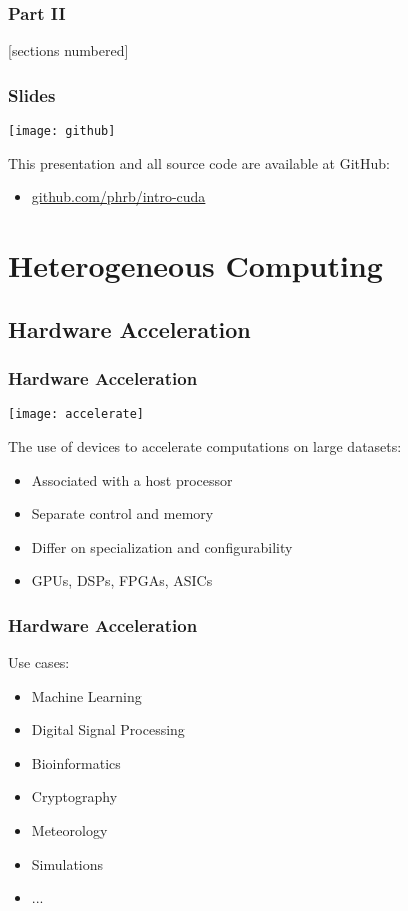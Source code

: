 \documentclass[10pt, compress]{beamer}
\begin{document}
\begin{frame}
    \frametitle{Part II}
    [sections numbered]
    \tableofcontents[hideallsubsections, part=2]
\end{frame}

\begin{frame}
    \frametitle{Slides}
    \begin{center}
        \texttt{[image: github]}
    \end{center}
    This presentation and all source code are available
    at \alert{GitHub}:

    \begin{itemize}
        \item \url{github.com/phrb/intro-cuda}
    \end{itemize}
\end{frame}

\section{Heterogeneous Computing}

\subsection{Hardware Acceleration}

\begin{frame}
    \frametitle{Hardware Acceleration}
    \begin{center}
        \texttt{[image: accelerate]}
    \end{center}

    The use of \alert{devices} to accelerate computations on large datasets:

    \begin{itemize}
        \item Associated with a \alert{host} processor

        \item Separate \alert{control} and \alert{memory}

        \item Differ on \alert{specialization} and \alert{configurability}

        \item \alert{GPUs}, DSPs, FPGAs, ASICs
    \end{itemize}
\end{frame}

\begin{frame}
    \frametitle{Hardware Acceleration}
    Use cases:
    \begin{itemize}
        \item Machine Learning
        \item Digital Signal Processing
        \item Bioinformatics
        \item Cryptography
        \item Meteorology
        \item Simulations
        \item ...
    \end{itemize}
\end{frame}
\end{document}
